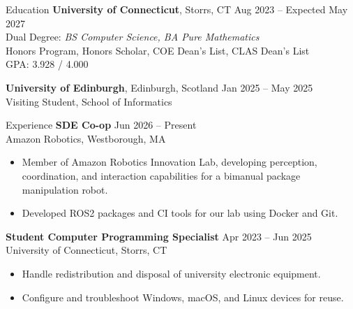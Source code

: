 \documentclass{resume}
\begin{document}

\begin{rSection}{Education}
    {\bf University of Connecticut}, Storrs, CT \hfill Aug 2023 -- Expected May 2027 \\
    Dual Degree: {\it BS Computer Science, BA Pure Mathematics} \\
    Honors Program, Honors Scholar, COE Dean's List, CLAS Dean's List \\
    GPA: 3.928 / 4.000

    {\bf University of Edinburgh}, Edinburgh, Scotland \hfill Jan 2025 -- May 2025 \\
    Visiting Student, School of Informatics

\end{rSection}


\begin{rSection}{Experience}
    \textbf{SDE Co-op} \hfill Jun 2026 -- Present \\
    Amazon Robotics, Westborough, MA
    \begin{itemize}
        \itemsep -4pt
        \item Member of Amazon Robotics Innovation Lab, developing perception, coordination, and interaction capabilities for a bimanual package manipulation robot.
        \item Developed ROS2 packages and CI tools for our lab using Docker and Git.
    \end{itemize}

    \textbf{Student Computer Programming Specialist} \hfill Apr 2023 -- Jun 2025 \\
    University of Connecticut, Storrs, CT
    \begin{itemize}
        \itemsep -4pt
        \item Handle redistribution and disposal of university electronic equipment.
        \item Configure and troubleshoot Windows, macOS, and Linux devices for reuse.
    \end{itemize}
\end{rSection}
\end{document}
